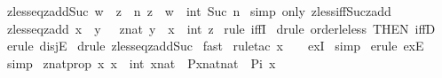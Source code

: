 \begin{isabellebody}
%
\endisadelimproof
\isanewline
{}\isamarkupfalse%
\ zless{\isacharunderscore}eq{\isacharunderscore}zadd{\isacharunderscore}Suc{\isacharcolon}\ {\isachardoublequoteopen}w\ {\isacharless}\ z\ {\isasymLongrightarrow}{\isacharquery}\ n{\isachardot}\ z\ {\isacharequal}\ w\ {\isacharplus}\ int\ {\isacharparenleft}Suc\ n{\isacharparenright}{\isachardoublequoteclose}\isanewline
%
\isadelimproof
%
\endisadelimproof
%
\isatagproof
{}\isamarkupfalse%
\ {\isacharparenleft}simp\ only{\isacharcolon}\ zless{\isacharunderscore}iff{\isacharunderscore}Suc{\isacharunderscore}zadd{\isacharparenright}\isanewline
{}\isamarkupfalse%
%
\endisatagproof
{\isafoldproof}%
%
\isadelimproof
\isanewline
%
\endisadelimproof
\isanewline
{}\isamarkupfalse%
\ zless{\isacharunderscore}eq{\isacharunderscore}zadd{\isacharcolon}\ {\isachardoublequoteopen}x\ {\isacharless}{\isacharequal}\ y\ {\isacharequal}\ {\isacharparenleft}{\isacharquery}\ z{\isacharcolon}{\isacharcolon}nat{\isachardot}\ y\ {\isacharequal}\ x\ {\isacharplus}\ int\ z{\isacharparenright}{\isachardoublequoteclose}\isanewline
%
\isadelimproof
%
\endisadelimproof
%
\isatagproof
{}\isamarkupfalse%
\ {\isacharparenleft}rule\ iffI{\isacharparenright}\isanewline
{}\isamarkupfalse%
\ {\isacharparenleft}drule\ order{\isacharunderscore}le{\isacharunderscore}less\ {\isacharbrackleft}THEN\ iffD{}{\isacharbrackright}{\isacharparenright}\isanewline
{}\isamarkupfalse%
\ {\isacharparenleft}erule\ disjE{\isacharparenright}\isanewline
{}\isamarkupfalse%
\ {\isacharparenleft}drule\ zless{\isacharunderscore}eq{\isacharunderscore}zadd{\isacharunderscore}Suc{\isacharparenright}\isanewline
{}\isamarkupfalse%
\ fast\isanewline
{}\isamarkupfalse%
\ {\isacharparenleft}rule{\isacharunderscore}tac\ x\ {\isacharequal}\ {\isachardoublequoteopen}{}{\isachardoublequoteclose}\ \ exI{\isacharparenright}\isanewline
{}\isamarkupfalse%
\ simp\isanewline
{}\isamarkupfalse%
\ {\isacharparenleft}erule\ exE{\isacharparenright}\isanewline
{}\isamarkupfalse%
\ simp\isanewline
{}\isamarkupfalse%
%
\endisatagproof
{\isafoldproof}%
%
\isadelimproof
\isanewline
%
\endisadelimproof
\isanewline
{}\isamarkupfalse%
\ znatprop{}{\isacharcolon}\ {\isachardoublequoteopen}{\isacharbang}{\isacharbang}x{\isachardot}\ x\ {\isacharequal}\ int\ xnat\ {\isacharequal}{\isacharequal}{\isachargreater}\ P{\isacharparenleft}xnat{\isacharcolon}{\isacharcolon}nat{\isacharparenright}\ {\isacharequal}\ P{\isacharparenleft}{\isachardollar}i\ x{\isacharparenright}{\isachardoublequoteclose}\isanewline

\end{isabellebody}
